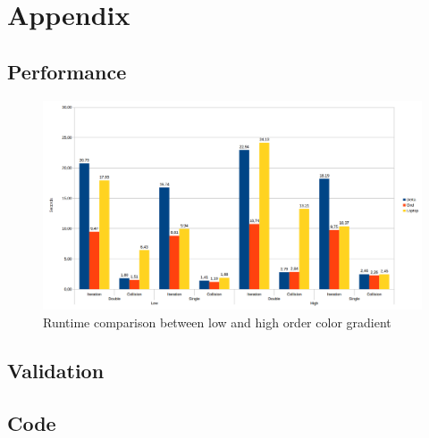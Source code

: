 \documentclass[12pt]{book}
\begin{document}
\backmatter
{}


\appendix
\chapter{Appendix}
\section{Performance}\label{app:perfo}
  \begin{figure}[H]
  	\centering
  	\includegraphics[width=\linewidth]{Resources/Images/highComp.png}
  	\caption{Runtime comparison between low and high order color gradient}
  	\label{fig:highComp}
  \end{figure}
\section{Validation}
\section{Code}
\end{document}
